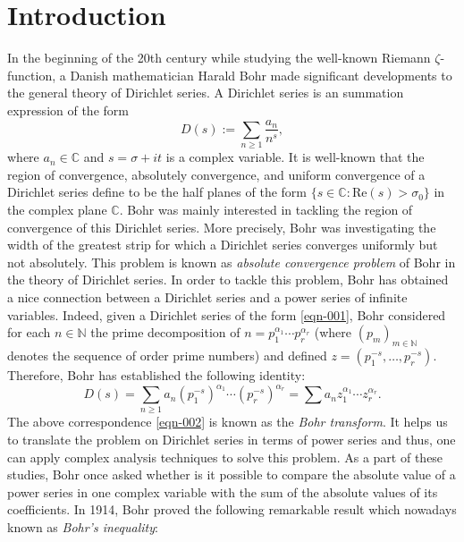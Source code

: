 \documentclass[a4paper,12pt]{amsart}
\theoremstyle{definition}
\newcounter {own}
\begin{document}
\section{Introduction}
 In the beginning of the 20th century while studying the well-known Riemann $\zeta$-function, a Danish mathematician Harald Bohr made significant developments to the general theory of Dirichlet series. A Dirichlet series is an summation expression of the form
\begin{equation}\label{eqn-001}
	D(s):=\sum_{n\geq 1}\frac{a_n}{n^s},
\end{equation}
where $a_n\in \mathbb{C}$ and $s=\sigma +it$ is a complex variable. It is well-known that the region of convergence, absolutely convergence, and uniform convergence of a Dirichlet series define to be the half planes of the form $\{s\in \mathbb{C}: \mbox{Re}(s)>\sigma_{0}\}$ in the complex plane $\mathbb{C}$. Bohr was mainly interested in tackling the region of convergence of this Dirichlet series. More precisely, Bohr was investigating the width of the greatest strip for which a Dirichlet series converges uniformly but not absolutely. This problem is known as \textit{absolute convergence problem} of Bohr in the theory of Dirichlet series. In order to tackle this problem, Bohr has obtained a nice connection between a Dirichlet series and a power series of infinite variables. Indeed, given a Dirichlet series of the form \eqref{eqn-001}, Bohr considered for each $n\in \mathbb{N}$ the prime decomposition of $n=p^{\alpha_1}_{1}\cdots p^{\alpha_r}_{r}$ (where $(p_m)_{m\in \mathbb{N}}$ denotes the sequence of order prime numbers) and defined $z=(p^{-s}_{1}, \ldots, p^{-s}_{r})$. Therefore, Bohr has established the following identity:
\begin{equation}\label{eqn-002}
	D(s)=\sum_{n\geq 1}a_n(p^{-s}_{1})^{\alpha_1}\cdots (p^{-s}_{r})^{\alpha_r}=\sum a_n z^{\alpha_1}_{1}\cdots z^{\alpha_r}_r.
\end{equation}
The above correspondence \eqref{eqn-002} is known as the \textit{Bohr transform}. It helps us to translate the problem on Dirichlet series in terms of power series and thus, one can apply complex analysis techniques to solve this problem. As a part of these studies, Bohr once asked whether is it possible to compare the absolute value of a power series in one complex variable with the sum of the absolute values of its coefficients. In 1914, Bohr \cite{Bohr-1914} proved the following remarkable result which nowadays known as \textit{Bohr's inequality}:
\end{document}
